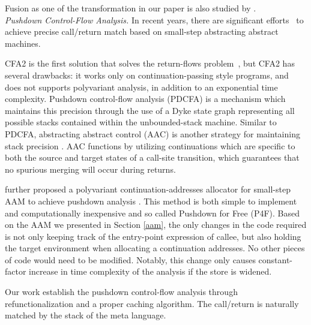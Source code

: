 \documentclass[acmsmall, review]{acmart}\settopmatter{}
\begin{document}
Fusion as one of the transformation in our paper is also studied by 
\citeauthor{Ohori:2007:LFF:1190216.1190241} \cite{Ohori:2007:LFF:1190216.1190241}. \\

\textit{Pushdown Control-Flow Analysis.}
In recent years, there are significant efforts~\cite{vardoulakis2010cfa2, earl2012introspective,
gilray2016pushdown, johnson2015abstracting} to achieve precise call/return
match based on small-step abstracting abstract machines.

CFA2 is the first solution that solves the return-flows problem~\cite{vardoulakis2010cfa2},
but CFA2 has several drawbacks: it works only on continuation-passing style programs,
and does not supports polyvariant analysis, in addition to an exponential time
complexity.
Pushdown control-flow analysis (PDCFA) is a mechanism which maintains this precision
through the use of a Dyke state graph representing all possible stacks contained
within the unbounded-stack machine\cite{earl2012introspective, earl2010pushdown}.
Similar to PDCFA, abstracting abstract control (AAC) is another strategy for
maintaining stack precision \cite{johnson2015abstracting}.
AAC functions by utilizing continuations which are specific to both
the source and target states of a call-site transition,
which guarantees that no spurious merging will occur during returns.

\citeauthor{gilray2016pushdown} further proposed a polyvariant continuation-addresses allocator
for small-step AAM to achieve pushdown analysis \cite{gilray2016pushdown}.
This method is both simple to implement and computationally inexpensive and so called Pushdown 
for Free (P4F). Based on the AAM we presented in Section \ref{aam}, the only changes in the 
code required is not only keeping track of the entry-point expression of callee, but also 
holding the target environment when allocating a continuation addresses.
No other pieces of code would need to be modified.
Notably, this change only causes constant-factor increase in time complexity of
the analysis if the store is widened.

Our work establish the pushdown control-flow analysis through refunctionalization and a
proper caching algorithm. The call/return is naturally matched by the stack of 
the meta language. \\
\end{document}
